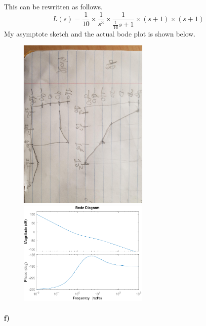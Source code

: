 \documentclass[12pt]{article}
\begin{document}
This can be rewritten as follows.
\[L(s)=\frac{1}{10}\times\frac{1}{s^3}\times\frac{1}{\frac{1}{10}s+1}\times(s+1)\times(s+1)\]
My asymptote sketch and the actual bode plot is shown below.
\begin{figure}[H]
    \begin{center}
        \includegraphics[width=2.5in]{problem1e.jpg}
        \includegraphics[width=2.5in]{problem1e.pdf}
    \end{center}
\end{figure}

\paragraph{f)}
\end{document}
